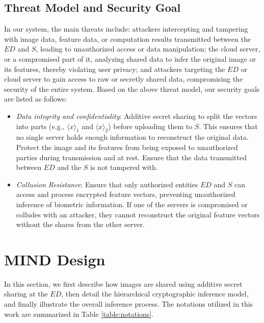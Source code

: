﻿\documentclass[conference]{IEEEtran}
\begin{document}
\subsection{Threat Model and Security Goal}
In our system, the main threats include: attackers intercepting and tampering with image data, feature data, or computation results transmitted between the $ED$ and $S$, leading to unauthorized access or data manipulation; the cloud server, or a compromised part of it, analyzing shared data to infer the original image or its features, thereby violating user privacy; and attackers targeting the $ED$ or cloud server to gain access to raw or secretly shared data, compromising the security of the entire system. Based on the above threat model, our security goals are listed as follows:
\begin{itemize}
     \item \textit{Data integrity and confidentiality}: Additive secret sharing to split the vectors into parts (e.g., $\langle x \rangle_1$ and $\langle x \rangle_2$) before uploading them to $S$. This ensures that no single server holds enough information to reconstruct the original data. Protect the image and its features from being exposed to unauthorized parties during transmission and at rest. Ensure that the data transmitted between $ED$ and the $S$ is not tampered with. 
     \item \textit{Collusion Resistance}: Ensure that only authorized entities $ED$ and $S$ can access and process encrypted feature vectors, preventing unauthorized inference of biometric information. If one of the servers is compromised or colludes with an attacker, they cannot reconstruct the original feature vectors without the shares from the other server.
 \end{itemize}

\section{MIND Design}
In this section, we first describe how images are shared using additive secret sharing at the $ED$, then detail the hierarchical cryptographic inference model, and finally illustrate the overall inference process. The notations utilized in this work are summarized in Table \ref{table:notations}.
\end{document}
